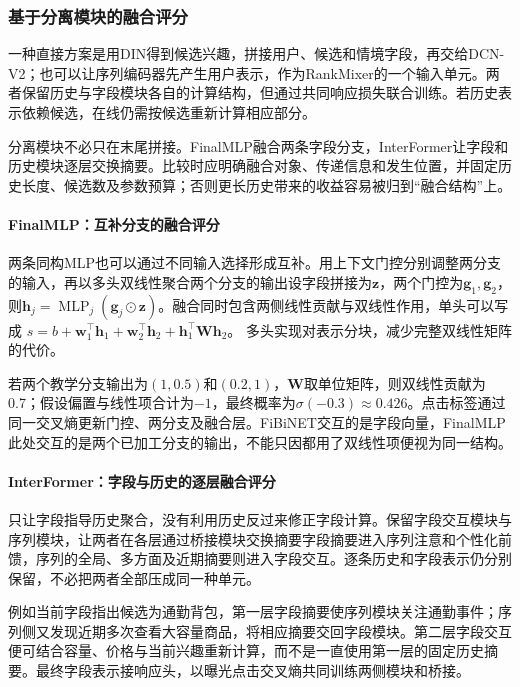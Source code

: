 \subsubsection{基于分离模块的融合评分}
\label{sec:rs-separate-fusion}

一种直接方案是用DIN得到候选兴趣，拼接用户、候选和情境字段，再交给DCN-V2；也可以让序列编码器先产生用户表示，作为RankMixer的一个输入单元。两者保留历史与字段模块各自的计算结构，但通过共同响应损失联合训练。若历史表示依赖候选，在线仍需按候选重新计算相应部分。

分离模块不必只在末尾拼接。FinalMLP融合两条字段分支，InterFormer让字段和历史模块逐层交换摘要。比较时应明确融合对象、传递信息和发生位置，并固定历史长度、候选数及参数预算；否则更长历史带来的收益容易被归到“融合结构”上。

\Needspace{90mm}
\paragraph{FinalMLP：互补分支的融合评分}
\label{sec:rs-finalmlp}

两条同构MLP也可以通过不同输入选择形成互补。用上下文门控分别调整两分支的输入，再以多头双线性聚合两个分支的输出设字段拼接为$\bm z$，两个门控为$\bm g_1,\bm g_2$，则$\bm h_j=\operatorname{MLP}_j(\bm g_j\odot\bm z)$。融合同时包含两侧线性贡献与双线性作用，单头可以写成
$s=b+\bm w_1^\top\bm h_1+\bm w_2^\top\bm h_2+\bm h_1^\top\bm W\bm h_2$。
多头实现对表示分块，减少完整双线性矩阵的代价。

若两个教学分支输出为$(1,0.5)$和$(0.2,1)$，$\bm W$取单位矩阵，则双线性贡献为0.7；假设偏置与线性项合计为$-1$，最终概率为$\sigma(-0.3)\approx0.426$。点击标签通过同一交叉熵更新门控、两分支及融合层。FiBiNET交互的是字段向量，FinalMLP此处交互的是两个已加工分支的输出，不能只因都用了双线性项便视为同一结构。

\paragraph{InterFormer：字段与历史的逐层融合评分}
\label{sec:rs-interformer}

只让字段指导历史聚合，没有利用历史反过来修正字段计算。保留字段交互模块与序列模块，让两者在各层通过桥接模块交换摘要字段摘要进入序列注意和个性化前馈，序列的全局、多方面及近期摘要则进入字段交互。逐条历史和字段表示仍分别保留，不必把两者全部压成同一种单元。

例如当前字段指出候选为通勤背包，第一层字段摘要使序列模块关注通勤事件；序列侧又发现近期多次查看大容量商品，将相应摘要交回字段模块。第二层字段交互便可结合容量、价格与当前兴趣重新计算，而不是一直使用第一层的固定历史摘要。最终字段表示接响应头，以曝光点击交叉熵共同训练两侧模块和桥接。

